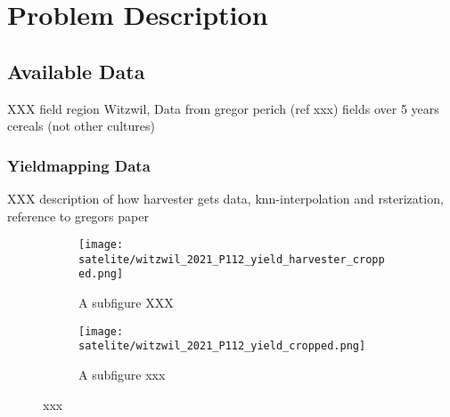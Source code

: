 \chapter{Problem Description}

\section{Available Data}
	{
		XXX field region Witzwil, Data from gregor perich (ref xxx)
		fields over 5 years 
		cereals (not other cultures)
	}
	\subsection{Yieldmapping Data}{
		XXX description of how harvester gets data, knn-interpolation and rsterization, reference to gregors paper
		\begin{figure}
			\centering
			\begin{subfigure}{.5\textwidth}
			  \centering
			  \texttt{[image: satelite/witzwil\_2021\_P112\_yield\_harvester\_cropped.png]}
			  \caption{A subfigure XXX}
		\end{subfigure}%
		\begin{subfigure}{.5\textwidth}
			\centering
			\texttt{[image: satelite/witzwil\_2021\_P112\_yield\_cropped.png]}
			  \caption{A subfigure xxx}
			\end{subfigure}
			\caption{xxx}
			\label{fig:test}
		\end{figure}
	}

